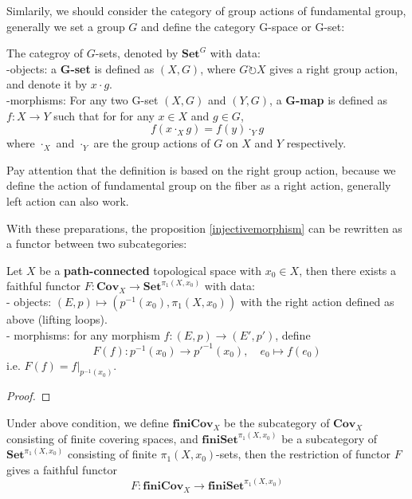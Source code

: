 Simlarily, we should consider the category of group actions of fundamental group, generally we set a group \(G\) and define the category G-space or G-set:

\begin{definition}
    The categroy of \(G\)-sets, denoted by \(\mathbf{Set}^G\) with data:\\

    -objects: a \textbf{G-set} is defined as \((X,G)\), where \(G\circlearrowright X\) gives a right group action, and denote it by \(x \cdot g\).\\

    -morphisms: For any two G-set \((X,G)\) and \((Y,G)\), a \textbf{G-map} is defined as \(f:X \to Y\) such that for for any \(x \in X\) and \(g \in G\),
    \[f(x \cdot_X g) = f(y)\cdot_Y g\]
    where \(\cdot_X\) and \(\cdot_Y\) are the group actions of \(G\) on \(X\) and \(Y\) respectively.
\end{definition}

Pay attention that the definition is based on the right group action, because we define the action of fundamental group on the fiber as a right action, generally left action can also work.

With these preparations, the proposition \ref{injectivemorphism} can be rewritten as a functor between two subcategories:
\begin{proposition}
    Let \(X\) be a \textbf{path-connected} topological space with \(x_0 \in X\), then there exists a faithful functor \(F:\mathbf{Cov}_X \to \mathbf{Set}^{\pi_1(X,x_0)}\) with data:\\

    - objects: \((E,p) \mapsto (p^{-1}(x_0), \pi_1(X,x_0))\) with the right action defined as above (lifting loops).\\

    - morphisms: for any morphism \(f:(E,p) \to (E',p')\), define
    \[F(f): p^{-1}(x_0) \to p'^{-1}(x_0), \quad e_0 \mapsto f(e_0)\]
    i.e. \(F(f) = f|_{p^{-1}(x_0)}\).
\end{proposition}
\begin{proof}
\end{proof}
\begin{corollary}
    Under above condition, we define \(\mathbf{finiCov}_X\) be the subcategory of \(\mathbf{Cov}_X\) consisting of finite covering spaces, and \(\mathbf{finiSet}^{\pi_1(X,x_0)}\) be a subcategory of \(\mathbf{Set}^{\pi_1(X,x_0)}\) consisting of finite \(\pi_1(X,x_0)\)-sets, then the restriction of functor \(F\) gives a faithful functor
    \[F:\mathbf{finiCov}_X \to \mathbf{finiSet}^{\pi_1(X,x_0)}\]
\end{corollary}


